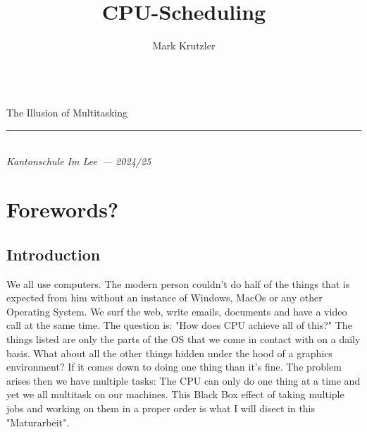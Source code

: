 \documentclass{report}
\title{CPU-Scheduling}
\author{Mark Krutzler}
\newcommand{\thesubtitle}{The Illusion of Multitasking}
\newcommand{\currentdate}{2024/25}
\newcommand{\auinstitution}{Kantonschule Im Lee}
\renewcommand{\maketitle}{
\begin{center}


{\Huge\bfseries
\thetitle}
\vspace{0.5em}\\
{\LARGE\thesubtitle}


{\rule{0.4\textwidth}{.4pt}}

{\bfseries \theauthor}\\
\textit{\auinstitution \ --- \currentdate}
\end{center}
}
\begin{document}
\begin{titlepage}
\vspace*{\fill}
\centering
\maketitle
\vspace*{\fill}
\end{titlepage}

\tableofcontents



\part{Forewords?}

\chapter*{Introduction}

We all use computers.
The modern person couldn't do half of the things that is expected from him without an instance of Windows, MacOs or any other Operating System.
We surf the web, write emails, documents and have a video call at the same time.
The question is: "How does CPU achieve all of this?" The things listed are only the parts of the OS that we come in contact with on a daily basis.
What about all the other things hidden under the hood of a graphics environment? If it comes down to doing one thing than it's fine.
The problem arises then we have multiple tasks: The CPU can only do one thing at a time and yet we all multitask on our machines.
This Black Box effect of taking multiple jobs and working on them in a proper order is what I will disect in this "Maturarbeit".
\end{document}
